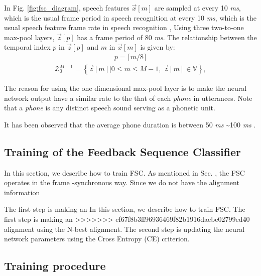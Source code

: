 \documentclass{article}
\begin{document}
In Fig. \ref{fig:fsc_diagram}, speech features $\vec{x}[m]$ are sampled 
at every 10 {\it ms}, which is the usual frame period in speech 
recognition
at every 10 {\it ms}, which is the usual speech feature frame rate  
in speech recognition
\cite{x_huang_prentice_hall_2001_00, c_kim_taslp_2016_00},
Using three two-to-one max-pool layers, $\vec{z}[p]$ has a frame period 
of 80 {\it ms}.  
The relationship between the temporal index $p$ in $\vec{z}[p]$ and 
$m$ in $\vec{x}[m]$ is given by: 
\begin{align}
  p = \lceil m / 8 \rceil \label{eq:def_p}
\end{align}
\begin{align}
  \mathcal{Z}_{0}^{M-1}  =  
    \left\{\vec{z}[m]  \Big| 0 \le m \le M-1, \; \vec{z}[m] \in \mathbb{V} \right\}, 
  \label{eq:frame_target_label}
\end{align}


The reason for using the one dimensional max-pool layer
is to make the neural network output have a similar rate to the 
that of each {\it phone} in utterances. Note that a {\it phone} 
is any distinct speech sound serving as a phonetic unit. 

It has been observed that the average phone duration is between 50 {\it ms}
\textasciitilde 100 {\it ms} \cite{x_wang_icslp_1996_00, z_bartosz_ltc_2009_00}.









\subsection{Training of the Feedback Sequence Classifier}
In this section, we describe how to train FSC. As mentioned in Sec. 
\label{ref:neural_network_structure}, the FSC operates in the frame
-synchronous way. Since we do not have the alignment information


The first step is making an
In this section, we describe how to train FSC. The first step is making an
>>>>>>> cf67f8b3ff96936469f82b1916daebe02799ed40
alignment using the N-best alignment. The second step is updating the
neural network parameters using the Cross Entropy (CE) criterion. 

\subsection{Training procedure}
\end{document}
